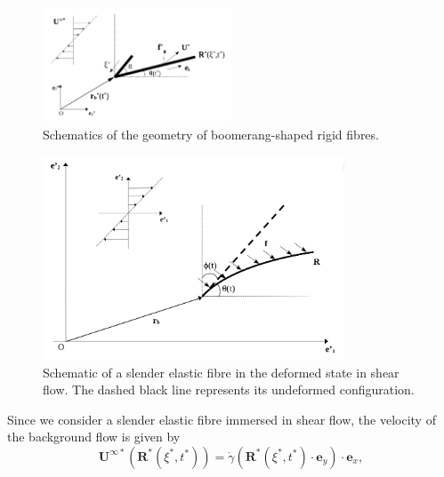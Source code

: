 \documentclass[lineno]{JFM-FLM_Au}
\begin{document}
\begin{figure}[htb]
	\begin{center}
		\includegraphics[width=0.5\textwidth]{plot/rigid_case/schematic_rigid_configuration_color0_old.png}
		\caption{Schematics of the geometry of boomerang-shaped rigid fibres.}
		\label{fig:23}
	\end{center}
\end{figure}
\begin{figure}[htb]
	\begin{center}
		\includegraphics[width=0.8\textwidth]{plot/fluid_general.png}
		\caption{Schematic of a slender elastic fibre in the deformed state in shear flow. The dashed black line represents its undeformed configuration.}
		\label{fig:5}
	\end{center}
\end{figure}
Since we consider a slender elastic fibre immersed in shear flow, the velocity of the background flow is given by
\begin{equation}
	\label{eqn:21}
	\mathbf{U}^{\infty*}(\mathbf{R}^*(\xi^*,t^*))=\dot{\gamma}\left(\mathbf{R}^*(\xi^*,t^*)\cdot\mathbf{e}_y\right)\cdot\mathbf{e}_x,
\end{equation}
\end{document}
